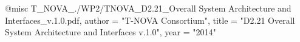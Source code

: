 @misc{ T_NOVA_./WP2/TNOVA_D2.21_Overall System Architecture and Interfaces_v.1.0.pdf,
       author = "{T-NOVA Consortium}",
       title = "D2.21 Overall System Architecture and Interfaces v.1.0",
       year = "2014" }
